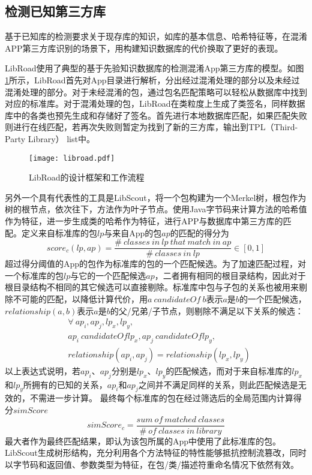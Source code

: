 \subsection{检测已知第三方库}

基于已知库的检测要求关于现存库的知识，如库的基本信息、哈希特征等，在混淆APP第三方库识别的场景下，用构建知识数据库的代价换取了更好的表现。

LibRoad\cite{xu2020libroad}使用了典型的基于先验知识数据库的检测混淆App第三方库的模型。如图\ref{fig:libroad}所示，LibRoad首先对App目录进行解析，分出经过混淆处理的部分以及未经过混淆处理的部分。对于未经混淆的包，通过包名匹配策略可以轻松从数据库中找到对应的标准库。对于混淆处理的包，LibRoad在类粒度上生成了类签名，同样数据库中的各类也预先生成和存储好了签名。首先进行本地数据库匹配，如果匹配失败则进行在线匹配，若再次失败则暂定为找到了新的三方库，输出到TPL（Third-Party Library） list中。

\begin{figure}[!htp]
  \centering
  \texttt{[image: libroad.pdf]} \\
  \caption{LibRoad的设计框架和工作流程}
 \label{fig:libroad}
\end{figure}

另外一个具有代表性的工具是LibScout\cite{backes2016reliable}，将一个包构建为一个Merkel树，根包作为树的根节点，依次往下，方法作为叶子节点。使用Java字节码来计算方法的哈希值作为特征，进一步生成类的哈希作为特征，进行APP与数据库中第三方库的匹配。定义来自标准库的包$lp$与来自App的包$ap$的匹配的得分为
\begin{equation}
score_c(lp,ap)=\frac{\#\ classes\ in\ lp\ that\ match\ in\ ap}{\#\ classes\ in\ lp} \in [0,1]
\end{equation}
超过得分阈值的App的包作为标准库的包的一个匹配候选。为了加速匹配过程，对一个标准库的包$lp$与它的一个匹配候选$ap$，二者拥有相同的根目录结构，因此对于根目录结构不相同的其它候选可以直接剔除。标准库中包与子包的关系也被用来剔除不可能的匹配，以降低计算代价，用$a\ candidateOf\ b$表示$a$是$b$的一个匹配候选，$relationship(a,b)$表示$a$是$b$的父/兄弟/子节点，则剔除不满足以下关系的候选：
\begin{equation}
\begin{aligned}
&\forall \ ap_i,ap_j,lp_x,lp_y,\\
& ap_i\ candidateOf lp_x,ap_j\ candidateOf lp_y,\\
& relationship(ap_i,ap_j)=relationship(lp_x,lp_y)
\end{aligned}
\end{equation}
以上表达式说明，若$ap_i$、$ap_j$分别是$lp_x$、$lp_y$的匹配候选，而对于来自标准库的$lp_x$和$lp_y$所拥有的已知的关系，$ap_i$和$ap_j$之间并不满足同样的关系，则此匹配候选是无效的，不需进一步计算。
最终每个标准库的包在经过筛选后的全局范围内计算得分$simScore$
\begin{equation}
simScore_c=\frac{sum\ of \ matched\ classes}{\#\ of\ classes\ in\ library}
\end{equation}
最大者作为最终匹配结果，即认为该包所属的App中使用了此标准库的包。LibScout生成树形结构，充分利用各个方法特征的特性能够抵抗控制流篡改，同时以字节码和返回值、参数类型为特征，在包/类/描述符重命名情况下依然有效。




